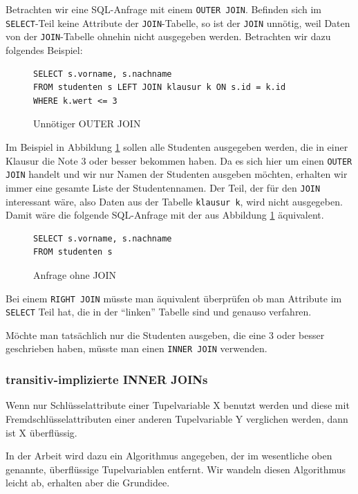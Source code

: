 Betrachten wir eine SQL-Anfrage mit einem \verb|OUTER JOIN|. Befinden sich im \verb|SELECT|-Teil keine Attribute der \verb|JOIN|-Tabelle, so ist der \verb|JOIN| unnötig, weil Daten von der \verb|JOIN|-Tabelle ohnehin nicht ausgegeben werden. Betrachten wir dazu folgendes Beispiel:

\begin{figure}[h]
\begin{lstlisting}[mathescape]
SELECT s.vorname, s.nachname 
FROM studenten s LEFT JOIN klausur k ON s.id = k.id 
WHERE k.wert <= 3
\end{lstlisting}
\caption{Unnötiger OUTER JOIN}
\label{fig:joinelem1}
\end{figure}

Im Beispiel in Abbildung \ref{fig:joinelem1} sollen alle Studenten ausgegeben werden, die in einer Klausur die Note 3 oder besser bekommen haben. Da es sich hier um einen \verb|OUTER JOIN| handelt und wir nur Namen der Studenten ausgeben möchten, erhalten wir immer eine gesamte Liste der Studentennamen. Der Teil, der für den \verb|JOIN| interessant wäre, also Daten aus der Tabelle \verb|klausur k|, wird nicht ausgegeben. Damit wäre die folgende SQL-Anfrage mit der aus Abbildung \ref{fig:joinelem1} äquivalent.

\begin{figure}[h]
\begin{lstlisting}[mathescape]
SELECT s.vorname, s.nachname 
FROM studenten s 
\end{lstlisting}
\caption{Anfrage ohne JOIN}
\label{fig:joinelem2}
\end{figure}

Bei einem \verb|RIGHT JOIN| müsste man äquivalent überprüfen ob man Attribute im \verb|SELECT| Teil hat, die in der ``linken'' Tabelle sind und genauso verfahren.

Möchte man tatsächlich nur die Studenten ausgeben, die eine 3 oder besser geschrieben haben, müsste man einen \verb|INNER JOIN| verwenden.

\subsubsection{transitiv-implizierte INNER JOINs}

Wenn nur Schlüsselattribute einer Tupelvariable X benutzt werden und diese mit Fremdschlüsselattributen einer anderen Tupelvariable Y verglichen werden, dann ist X überflüssig.

In der Arbeit \cite{joinelem2} wird dazu ein Algorithmus angegeben, der im wesentliche oben genannte, überflüssige Tupelvariablen entfernt. Wir wandeln diesen Algorithmus leicht ab, erhalten aber die Grundidee.

